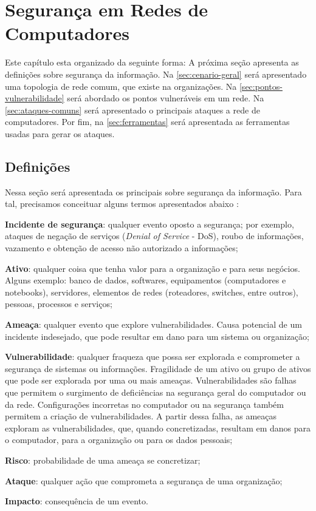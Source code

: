\chapter{Segurança em Redes de Computadores} \label{ch:segurança}

Este capítulo esta organizado da seguinte forma: A próxima seção apresenta as definições sobre segurança da informação. Na \autoref{sec:cenario-geral} será apresentado uma topologia de rede comum, que existe na organizações. Na \autoref{sec:pontos-vulnerabilidade} será abordado os pontos vulneráveis em um rede. Na \autoref{sec:ataques-comuns} será apresentado o principais ataques a rede de computadores. Por fim, na \autoref{sec:ferramentas} será apresentada as ferramentas usadas para gerar os ataques.

\section{Definições} \label{sec:definições}

Nessa seção será apresentada os principais sobre segurança da informação. Para tal, precisamos conceituar alguns termos apresentados abaixo \cite{esr-gestao}:

\begin{alineas}
\item \textbf{Incidente de segurança}: qualquer evento oposto a segurança; por exemplo, ataques de negação de serviços (\textit{Denial of Service} - DoS), roubo de informações, vazamento e obtenção de acesso não autorizado a informações;
 \item \textbf{Ativo}: qualquer coisa que tenha valor para a organização e para seus negócios. Alguns exemplo: banco de dados, softwares, equipamentos (computadores e notebooks), servidores, elementos de redes (roteadores, switches, entre outros), pessoas, processos e serviços;
 \item \textbf{Ameaça}: qualquer evento que explore vulnerabilidades. Causa potencial de um incidente indesejado, que pode resultar em dano para um sistema ou organização;
 \item \textbf{Vulnerabilidade}: qualquer fraqueza que possa ser explorada e comprometer a segurança de sistemas ou informações. Fragilidade de um ativo ou grupo de ativos que pode ser explorada por uma ou mais ameaças. Vulnerabilidades são falhas que permitem o surgimento de deficiências na segurança geral do computador ou da rede. Configurações incorretas no computador ou na segurança também permitem a criação de vulnerabilidades. A partir dessa falha, as ameaças exploram as vulnerabilidades, que, quando concretizadas, resultam em danos para o computador, para a organização ou para os dados pessoais;
 \item \textbf{Risco}: probabilidade de uma ameaça se concretizar;
 \item \textbf{Ataque}: qualquer ação que comprometa a segurança de uma organização;
 \item \textbf{Impacto}: consequência de um evento.
\end{alineas}

